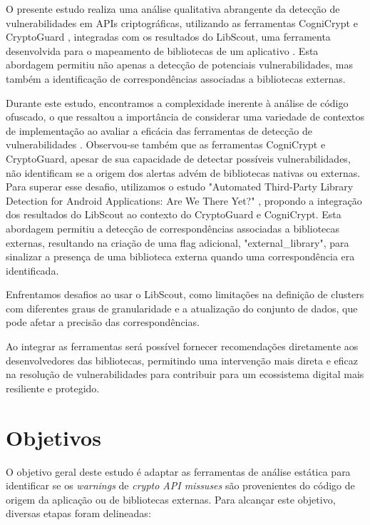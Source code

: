 O presente estudo realiza uma análise qualitativa abrangente da detecção de vulnerabilidades em APIs criptográficas, utilizando as ferramentas CogniCrypt \cite{CogniCrypt} e CryptoGuard \cite{CryptoGuard}, integradas com os resultados do LibScout, uma ferramenta desenvolvida para o mapeamento de bibliotecas de um aplicativo \cite{LibScout}. Esta abordagem permitiu não apenas a detecção de potenciais vulnerabilidades, mas também a identificação de correspondências associadas a bibliotecas externas.

Durante este estudo, encontramos a complexidade inerente à análise de código ofuscado, o que ressaltou a importância de considerar uma variedade de contextos de implementação ao avaliar a eficácia das ferramentas de detecção de vulnerabilidades \cite{api_tpl_zhang}. Observou-se também que as ferramentas CogniCrypt e CryptoGuard, apesar de sua capacidade de detectar possíveis vulnerabilidades, não identificam se a origem dos alertas advém de bibliotecas nativas ou externas. 
Para superar esse desafio, utilizamos o estudo "Automated Third-Party Library Detection for Android Applications: Are We There Yet?" \cite{api_tpl_zhang}, propondo a integração dos resultados do LibScout ao contexto do CryptoGuard e CogniCrypt. Esta abordagem permitiu a detecção de correspondências associadas a bibliotecas externas, resultando na criação de uma flag adicional, "external\_library", para sinalizar a presença de uma biblioteca externa quando uma correspondência era identificada.

 Enfrentamos desafios ao usar o LibScout, como limitações na definição de clusters com diferentes graus de granularidade e a atualização do conjunto de dados, que pode afetar a precisão das correspondências. 
 
 Ao integrar as ferramentas será possível fornecer recomendações diretamente aos desenvolvedores das bibliotecas, permitindo uma intervenção mais direta e eficaz na resolução de vulnerabilidades para contribuir para um ecossistema digital mais resiliente e protegido.

\section{Objetivos}

O objetivo geral deste estudo é adaptar as ferramentas de análise estática para identificar se os \textit{warnings} de \textit{crypto API missuses} são provenientes do código de origem da aplicação ou de bibliotecas externas. Para alcançar este objetivo, diversas etapas foram delineadas:

